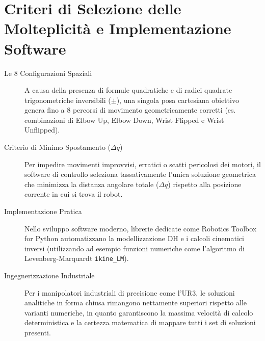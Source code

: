 \section{Criteri di Selezione delle Molteplicità e Implementazione Software}
\begin{description}
    \item [Le 8 Configurazioni Spaziali] A causa della presenza di formule quadratiche e di radici quadrate trigonometriche inversibili ($\pm$), una singola posa cartesiana obiettivo genera fino a 8 percorsi di movimento geometricamente corretti (es. combinazioni di Elbow Up, Elbow Down, Wrist Flipped e Wrist Unflipped).
    \item [Criterio di Minimo Spostamento ($\Delta q$)] Per impedire movimenti improvvisi, erratici o scatti pericolosi dei motori, il software di controllo seleziona tassativamente l'unica soluzione geometrica che minimizza la distanza angolare totale ($\Delta q$) rispetto alla posizione corrente in cui si trova il robot.
    \item [Implementazione Pratica] Nello sviluppo software moderno, librerie dedicate come Robotics Toolbox for Python automatizzano la modellizzazione DH e i calcoli cinematici inversi (utilizzando ad esempio funzioni numeriche come l'algoritmo di Levenberg-Marquardt \verb|ikine_LM|).
    \item [Ingegnerizzazione Industriale] Per i manipolatori industriali di precisione come l'UR3, le soluzioni analitiche in forma chiusa rimangono nettamente superiori rispetto alle varianti numeriche, in quanto garantiscono la massima velocità di calcolo deterministica e la certezza matematica di mappare tutti i set di soluzioni presenti.
\end{description}